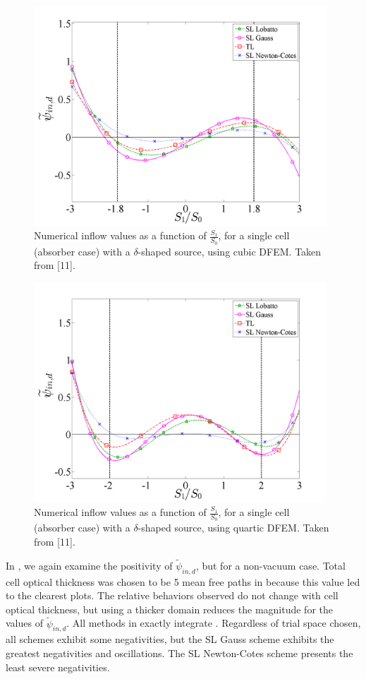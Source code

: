 \begin{figure}[!hbp]
\centering
\includegraphics[width=11cm]{chapter2_constant_xs/Final_Inflow_RHS_Comparison_Source_P3_MFP_5.png}
\caption{Numerical inflow values  as a function of $\frac{S_1}{S_0}$, for a single cell (absorber case) with a $\delta$-shaped source, using cubic DFEM.  Taken from [11].}
\label{fig:abs_inflow_p3}
\end{figure}
\begin{figure}[!htp]
\centering
\includegraphics[width=11cm]{chapter2_constant_xs/Final_Inflow_RHS_Comparison_Source_P4_MFP_5.png}
\caption{Numerical inflow values  as a function of $\frac{S_1}{S_0}$, for a single cell (absorber case) with a $\delta$-shaped source, using quartic DFEM.  Taken from [11].}
\label{fig:abs_inflow_p4}
\end{figure}
\newpage
In , we again examine the positivity of $\widetilde{\psi}_{in,d}$, but for a non-vacuum case.
Total cell optical thickness was chosen to be 5 mean free paths in  because this value led to the clearest plots.
The relative behaviors observed do not change with cell optical thickness, but using a thicker domain reduces the magnitude for the values of $\widetilde{\psi}_{in,d}$.
All methods in  exactly integrate .
Regardless of trial space chosen,  all schemes exhibit some negativities, but the SL Gauss scheme exhibits the greatest negativities and oscillations. 
The SL Newton-Cotes scheme presents the least severe negativities.



